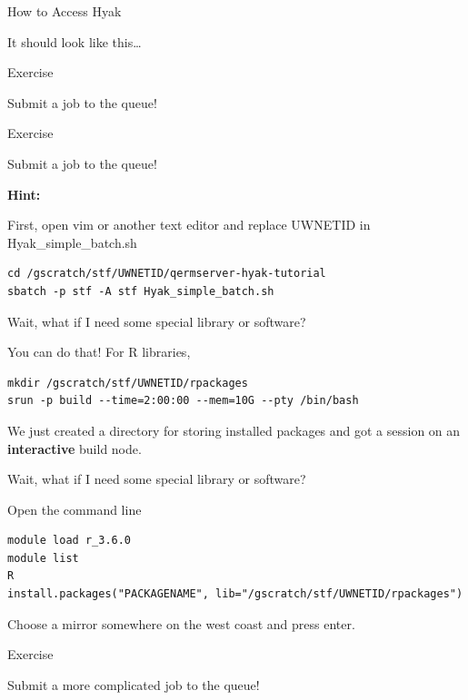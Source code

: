 \documentclass[ignorenonframetext,]{beamer}
\begin{document}
\begin{frame}[fragile]{How to Access Hyak}
\begin{block}{It should look like this\ldots{}}
\end{block}

\begin{block}{Exercise}

Submit a job to the queue!

\end{block}

\begin{block}{Exercise}

Submit a job to the queue!

\textbf{Hint:}

First, open vim or another text editor and replace UWNETID in
Hyak\_simple\_batch.sh

\begin{verbatim}
cd /gscratch/stf/UWNETID/qermserver-hyak-tutorial
sbatch -p stf -A stf Hyak_simple_batch.sh
\end{verbatim}

\end{block}

\begin{block}{Wait, what if I need some special library or software?}

You can do that! For R libraries,

\begin{verbatim}
mkdir /gscratch/stf/UWNETID/rpackages
srun -p build --time=2:00:00 --mem=10G --pty /bin/bash
\end{verbatim}

We just created a directory for storing installed packages and got a
session on an \textbf{interactive} build node.

\end{block}

\begin{block}{Wait, what if I need some special library or software?}

Open the command line

\begin{verbatim}
module load r_3.6.0
module list
R
install.packages("PACKAGENAME", lib="/gscratch/stf/UWNETID/rpackages")
\end{verbatim}

Choose a mirror somewhere on the west coast and press enter.

\end{block}

\begin{block}{Exercise}

Submit a more complicated job to the queue!


\end{block}
\end{frame}
\end{document}
